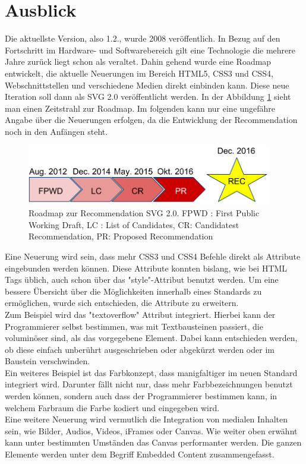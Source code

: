 \section{Ausblick}
Die aktuellste Version, also 1.2., wurde 2008 veröffentlich. In Bezug auf den Fortschritt im Hardware- und Softwarebereich gilt eine Technologie die mehrere Jahre zurück liegt schon als veraltet. Dahin gehend wurde eine Roadmap entwickelt, die aktuelle Neuerungen im Bereich HTML5, CSS3 und CSS4, Webschnittstellen und verschiedene Medien direkt einbinden kann. Diese neue Iteration soll dann als SVG 2.0 veröffentlicht werden. In der Abbildung \ref{roadmap} sieht man einen Zeitstrahl zur Roadmap. Im folgenden kann nur eine ungefähre Angabe über die Neuerungen erfolgen, da die Entwicklung der Recommendation noch in den Anfängen steht.\\

\begin{figure}[!ht]
  \centering
  \includegraphics[width=0.95\textwidth]{pictures/roadmap.jpg}
  \caption{Roadmap zur Recommendation SVG 2.0. FPWD : First Public Working Draft,
    LC : List of Candidates,
    CR: Candidatest Recommendation,
  PR: Proposed Recommendation}
  \label{roadmap}
\end{figure}
Eine Neuerung wird sein, dass mehr CSS3 und CSS4 Befehle direkt als Attribute eingebunden werden können. Diese Attribute konnten bislang, wie bei HTML Tags üblich, auch schon über das "style"-Attribut benutzt werden. Um eine bessere Übersicht über die Möglichkeiten innerhalb eines Standards zu ermöglichen, wurde sich entschieden, die Attribute zu erweitern.\\
Zum Beispiel wird das "textoverflow" Attribut integriert. Hierbei kann der Programmierer selbst bestimmen, was mit Textbausteinen passiert, die voluminöser sind, als das vorgegebene Element. Dabei kann entschieden werden, ob diese einfach unberührt ausgeschrieben oder abgekürzt werden oder im Baustein verschwinden. \\
Ein weiteres Beispiel ist das Farbkonzept, dass manigfaltiger im neuen Standard integriert wird. Darunter fällt nicht nur, dass mehr Farbbezeichnungen benutzt werden können, sondern auch dass der Programmierer bestimmen kann, in welchem Farbraum die Farbe kodiert und eingegeben wird.\\

Eine weitere Neuerung wird vermutlich die Integration von medialen Inhalten sein, wie Bilder, Audios, Videos, iFrames oder Canvas. Wie weiter oben erwähnt kann unter bestimmten Umständen das Canvas performanter werden. Die ganzen Elemente werden unter dem Begriff Embedded Content zusammengefasst.\\

